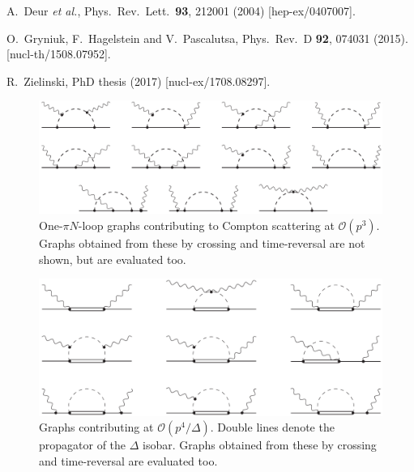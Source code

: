 \documentclass[twocolumn,prc,showpacs,nofootinbib,preprintnumbers,amsmath,amssymb,superscriptaddress]{revtex4-1}
\begin{document}
\begin{thebibliography}{99}
  A.~Deur {\it et al.},
  Phys.\ Rev.\ Lett.\  {\bf 93}, 212001 (2004)
  [hep-ex/0407007].

O.~Gryniuk, F.~Hagelstein and V.~Pascalutsa,
Phys.\ Rev.\ D {\bf 92}, 074031 (2015). [nucl-th/1508.07952].

R.~Zielinski, PhD thesis (2017) [nucl-ex/1708.08297].

\end{thebibliography}



 \begin{figure}[bt]
 \centering
 \includegraphics[width=0.95\columnwidth]{Diags1_pv.pdf} 
\caption{%
One-$\pi N$-loop graphs contributing to Compton scattering at $\mathcal{O}(p^3)$. Graphs obtained from these by
crossing and time-reversal are not shown, but are evaluated too.
}
\label{Fig:loops_pv}
\end{figure}

\begin{figure}[t]
\centering
\includegraphics[width=0.95\columnwidth]{DeltaDiags4.pdf} 
\caption{%
Graphs contributing at  $\mathcal{O}(p^4/\mathit{\Delta})$. 
Double lines denote the propagator of the $\Delta$ isobar.
Graphs obtained from these by
crossing and time-reversal are evaluated too.}
\label{Fig:loopsD}
\end{figure}
\end{document}
